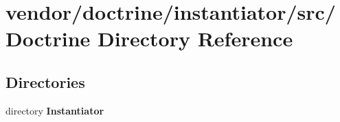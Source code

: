\section{vendor/doctrine/instantiator/src/\+Doctrine Directory Reference}
\label{dir_af4eaa6e2ff8f0c7964442dc96c8d742}
\subsection*{Directories}
\begin{DoxyCompactItemize}
\item 
directory {\bf Instantiator}
\end{DoxyCompactItemize}
